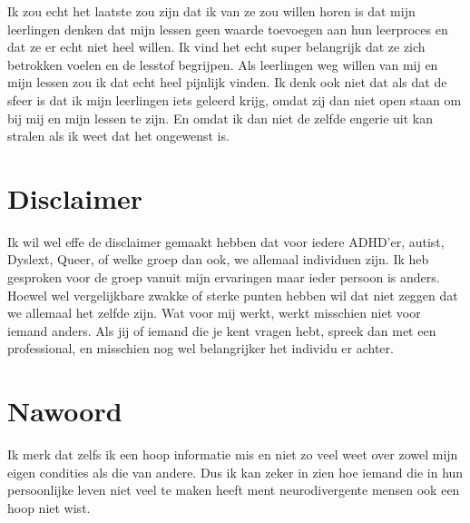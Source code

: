 \documentclass{article}
\begin{document}
            Ik zou echt het laatste zou zijn dat ik van ze zou willen horen is dat mijn leerlingen denken dat mijn lessen geen waarde toevoegen aan hun leerproces en dat ze er echt niet heel willen. Ik vind het echt super belangrijk dat ze zich betrokken voelen en de lesstof begrijpen. Als leerlingen weg willen van mij en mijn lessen zou ik dat echt heel pijnlijk vinden. Ik denk ook niet dat als dat de sfeer is dat ik mijn leerlingen iets geleerd krijg, omdat zij dan niet open staan om bij mij en mijn lessen te zijn. En omdat ik dan niet de zelfde engerie uit kan stralen als ik weet dat het ongewenst is.

    
    \section{Disclaimer}

        Ik wil wel effe de disclaimer gemaakt hebben dat voor iedere ADHD'er, autist, Dyslext, Queer, of welke groep dan ook, we allemaal individuen zijn. Ik heb gesproken voor de groep vanuit mijn ervaringen maar ieder persoon is anders. Hoewel wel vergelijkbare zwakke of sterke punten hebben wil dat niet zeggen dat we allemaal het zelfde zijn. Wat voor mij werkt, werkt misschien niet voor iemand anders. Als jij of iemand die je kent vragen hebt, spreek dan met een professional, en misschien nog wel belangrijker het individu er achter.
    
    
    \section{Nawoord}

        Ik merk dat zelfs ik een hoop informatie mis en niet zo veel weet over zowel mijn eigen condities als die van andere. Dus ik kan zeker in zien hoe iemand die in hun persoonlijke leven niet veel te maken heeft ment neurodivergente mensen ook een hoop niet wist. 
        
\end{document}

